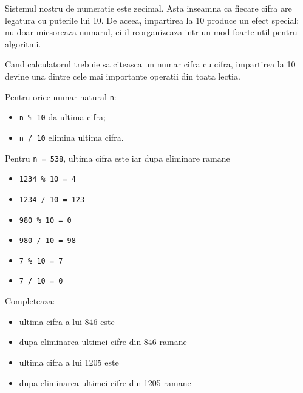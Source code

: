 
\begin{missionbox}[De ce tocmai 10]
  Sistemul nostru de numeratie este zecimal. Asta inseamna ca fiecare cifra are legatura cu puterile lui 10. De aceea, impartirea la 10 produce un efect special: nu doar micsoreaza numarul, ci il reorganizeaza intr-un mod foarte util pentru algoritmi.

  Cand calculatorul trebuie sa citeasca un numar cifra cu cifra, impartirea la 10 devine una dintre cele mai importante operatii din toata lectia.
\end{missionbox}

\begin{conceptbox}
  Pentru orice numar natural \texttt{n}:
  \begin{itemize}
    \item \texttt{n \% 10} da ultima cifra;
    \item \texttt{n / 10} elimina ultima cifra.
  \end{itemize}
\end{conceptbox}

\begin{guidebox}
  Pentru \texttt{n = 538}, ultima cifra este \hrulefill iar dupa eliminare ramane \hrulefill
\end{guidebox}

\newpage
{}

\begin{examplebox}[Exemple]
  \begin{itemize}
    \item \texttt{1234 \% 10 = 4}
    \item \texttt{1234 / 10 = 123}
    \item \texttt{980 \% 10 = 0}
    \item \texttt{980 / 10 = 98}
    \item \texttt{7 \% 10 = 7}
    \item \texttt{7 / 10 = 0}
  \end{itemize}
\end{examplebox}

\begin{guidebox}
  Completeaza:
  \begin{itemize}
    \item ultima cifra a lui 846 este \hrulefill
    \item dupa eliminarea ultimei cifre din 846 ramane \hrulefill
    \item ultima cifra a lui 1205 este \hrulefill
    \item dupa eliminarea ultimei cifre din 1205 ramane \hrulefill
  \end{itemize}
\end{guidebox}


